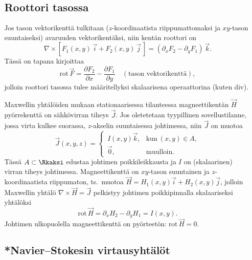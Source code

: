 \subsection{Roottori tasossa}

Jos tason vektorikenttä tulkitaan ($z$-koordinaatista riippumattomaksi ja $xy$-tason
suuntaiseksi) avaruuden vektorikentäksi, niin kentän roottori on
\[
\nabla\times[F_1(x,y)\,\vec i+F_2(x,y)\,\vec j\,] =(\partial_x F_2-\partial_y F_1)\,\vec k.
\]
Tässä on tapana kirjoittaa
\[
\text{rot}\,\vec F = \frac{\partial F_2}{\partial x}-\frac{\partial F_1}{\partial y}
                   \quad (\text{tason vektorikenttä}),
\]
jolloin roottori tasossa tulee määritellyksi skalaarisena operaattorina (kuten div). 
\begin{Exa} Maxwellin yhtälöiden mukaan stationaarisessa tilanteessa magneettikentän $\vec H$
pyörrekenttä on sähkövirran tiheys $\vec J$. Jos oletetetaan tyypillinen sovellustilanne,
jossa virta kulkee suorassa, $z$-akselin suuntaisessa johtimessa, niin $\vec J$ on muotoa
\[
\vec J(x,y,z)=\begin{cases} 
              \,I(x,y)\vec k, &\text{kun}\ (x,y) \in A, \\ \,\vec 0, &\text{muulloin}.
              \end{cases}
\]
Tässä $A\subset\Rkaksi$ edustaa johtimen poikkileikkausta ja $I$ on (skalaarinen) virran tiheys
johtimessa. Magneettikenttä on $xy$-tason suuntainen ja $z$-koordinaatista riippumaton,
ts.\ muotoa $\vec H = H_1(x,y)\vec i + H_2(x,y)\vec j$, jolloin Maxwellin yhtälö 
$\nabla\times\vec H=\vec J$ pelkistyy johtimen poikkipinnalla skalaariseksi yhtälöksi
\[
\text{rot}\,\vec H = \partial_x H_2 - \partial_y H_1 = I(x,y).
\]
Johtimen ulkopuolella magneettikenttä on pyörteetön: $\text{rot}\,\vec H=0$. \loppu
\end{Exa}

\subsection{*Navier--Stokesin virtausyhtälöt}

